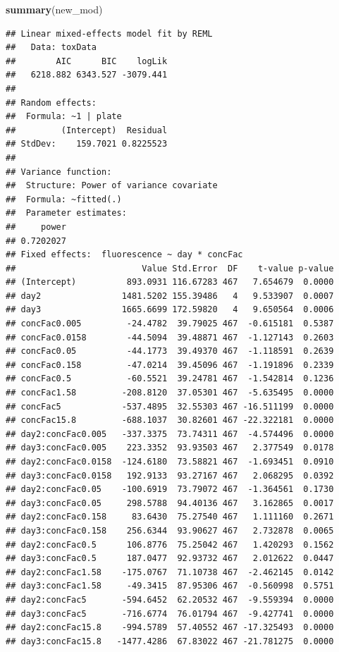 \documentclass[
]{article}
\newenvironment{Shaded}{\begin{snugshade}}{\end{snugshade}}
\newcommand{\FunctionTok}[1]{\textcolor[rgb]{0.13,0.29,0.53}{\textbf{#1}}}
\newcommand{\NormalTok}[1]{#1}
\begin{document}
\begin{Shaded}
\begin{Highlighting}[]
\FunctionTok{summary}\NormalTok{(new\_mod)}
\end{Highlighting}
\end{Shaded}

\begin{verbatim}
## Linear mixed-effects model fit by REML
##   Data: toxData 
##        AIC      BIC    logLik
##   6218.882 6343.527 -3079.441
## 
## Random effects:
##  Formula: ~1 | plate
##         (Intercept)  Residual
## StdDev:    159.7021 0.8225523
## 
## Variance function:
##  Structure: Power of variance covariate
##  Formula: ~fitted(.) 
##  Parameter estimates:
##     power 
## 0.7202027 
## Fixed effects:  fluorescence ~ day * concFac 
##                         Value Std.Error  DF    t-value p-value
## (Intercept)          893.0931 116.67283 467   7.654679  0.0000
## day2                1481.5202 155.39486   4   9.533907  0.0007
## day3                1665.6699 172.59820   4   9.650564  0.0006
## concFac0.005         -24.4782  39.79025 467  -0.615181  0.5387
## concFac0.0158        -44.5094  39.48871 467  -1.127143  0.2603
## concFac0.05          -44.1773  39.49370 467  -1.118591  0.2639
## concFac0.158         -47.0214  39.45096 467  -1.191896  0.2339
## concFac0.5           -60.5521  39.24781 467  -1.542814  0.1236
## concFac1.58         -208.8120  37.05301 467  -5.635495  0.0000
## concFac5            -537.4895  32.55303 467 -16.511199  0.0000
## concFac15.8         -688.1037  30.82601 467 -22.322181  0.0000
## day2:concFac0.005   -337.3375  73.74311 467  -4.574496  0.0000
## day3:concFac0.005    223.3352  93.93503 467   2.377549  0.0178
## day2:concFac0.0158  -124.6180  73.58821 467  -1.693451  0.0910
## day3:concFac0.0158   192.9133  93.27167 467   2.068295  0.0392
## day2:concFac0.05    -100.6919  73.79072 467  -1.364561  0.1730
## day3:concFac0.05     298.5788  94.40136 467   3.162865  0.0017
## day2:concFac0.158     83.6430  75.27540 467   1.111160  0.2671
## day3:concFac0.158    256.6344  93.90627 467   2.732878  0.0065
## day2:concFac0.5      106.8776  75.25042 467   1.420293  0.1562
## day3:concFac0.5      187.0477  92.93732 467   2.012622  0.0447
## day2:concFac1.58    -175.0767  71.10738 467  -2.462145  0.0142
## day3:concFac1.58     -49.3415  87.95306 467  -0.560998  0.5751
## day2:concFac5       -594.6452  62.20532 467  -9.559394  0.0000
## day3:concFac5       -716.6774  76.01794 467  -9.427741  0.0000
## day2:concFac15.8    -994.5789  57.40552 467 -17.325493  0.0000
## day3:concFac15.8   -1477.4286  67.83022 467 -21.781275  0.0000

\end{verbatim}
\end{document}

